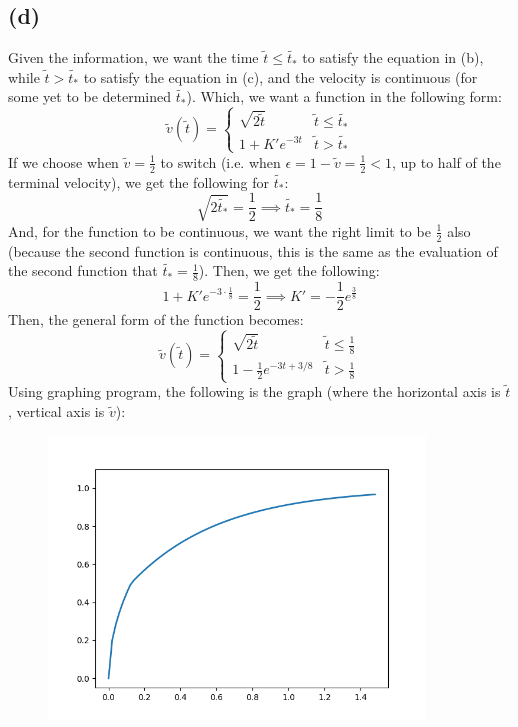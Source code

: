 \documentclass{article}
\begin{document}
\subsection*{(d)}
Given the information, we want the time $\tilde{t}\leq \tilde{t_*}$ to satisfy the equation in (b), while $\tilde{t}>\tilde{t_*}$ to satisfy the equation in (c), and the velocity is continuous (for some yet to be determined $\tilde{t_*}$). Which, we want a function in the following form:
$$\tilde{v}(\tilde{t})=\begin{cases}
    \sqrt{2\tilde{t}} & \tilde{t}\leq\tilde{t_*}\\
    1+K'e^{-3t} & \tilde{t}>\tilde{t_*}
\end{cases}$$
If we choose when $\tilde{v}=\frac{1}{2}$ to switch (i.e. when $\epsilon = 1-\tilde{v} = \frac{1}{2}<1$, up to half of the terminal velocity), we get the following for $\tilde{t_*}$:
$$\sqrt{2\tilde{t_*}} = \frac{1}{2}\implies \tilde{t_*}= \frac{1}{8}$$
And, for the function to be continuous, we want the right limit to be $\frac{1}{2}$ also (because the second function is continuous, this is the same as the evaluation of the second function that $\tilde{t_*}=\frac{1}{8}$). Then, we get the following:
$$1+K'e^{-3\cdot\frac{1}{8}} = \frac{1}{2}\implies K' = -\frac{1}{2}e^{\frac{3}{8}}$$
Then, the general form of the function becomes:
$$\tilde{v}(\tilde{t})=\begin{cases}
    \sqrt{2\tilde{t}} & \tilde{t}\leq \frac{1}{8}\\
    1-\frac{1}{2}e^{-3t+3/8} & \tilde{t}>\frac{1}{8}
\end{cases}$$
Using graphing program, the following is the graph (where the horizontal axis is $\tilde{t}$, vertical axis is $\tilde{v}$):
\begin{figure}[h!]
    \begin{center}
        \includegraphics[width = 100mm]{Question 3 plot.png}
    \end{center}
\end{figure}
\end{document}
